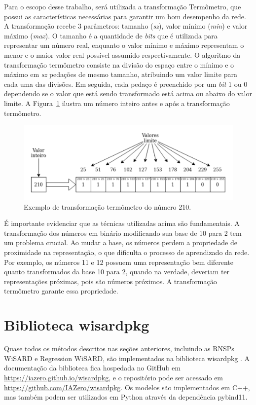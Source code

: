 Para o escopo desse trabalho, será utilizada a transformação Termômetro, que possui as características necessárias para garantir um bom desempenho da rede. A transformação recebe 3 parâmetros: tamanho (\textit{sz}), valor mínimo (\textit{min}) e valor máximo (\textit{max}). O tamanho é a quantidade de \textit{bits} que é utilizada para representar um número real, enquanto o valor mínimo e máximo representam o menor e o maior valor real possível assumido respectivamente. O algoritmo da transformação termômetro consiste na divisão do espaço entre o mínimo e o máximo em \textit{sz} pedações de mesmo tamanho, atribuindo um valor limite para cada uma das divisões. Em seguida, cada pedaço é preenchido por um \textit{bit} $1$ ou $0$ dependendo se o valor que está sendo transformado está acima ou abaixo do valor limite. A Figura~\ref{fig:therm_ex} ilustra um número inteiro antes e após a transformação termômetro.

\begin{figure}[!htp]
    \centering
    \includegraphics[width=5.0in]{img/therm_example.pdf}
    \caption{Exemplo de transformação termômetro do número 210.}
    \label{fig:therm_ex}
\end{figure}

É importante evidenciar que as técnicas utilizadas acima são fundamentais. A transformação dos números em binário modificando sua base de 10 para 2 tem um problema crucial. Ao mudar a base, os números perdem a propriedade de proximidade na representação, o que dificulta o processo de aprendizado da rede. Por exemplo, os números 11 e 12 possuem uma representação bem diferente quanto transformados da base 10 para 2, quando na verdade, deveriam ter representações próximas, pois são números próximos. A transformação termômetro garante essa propriedade.

\section{Biblioteca wisardpkg} \label{sec:wisardpkg}
Quase todos os métodos descritos nas seções anteriores, incluindo as RNSPs WiSARD e Regression WiSARD, são implementados na biblioteca wisardpkg \cite{wisardpkg}. A documentação da biblioteca fica hospedada no GitHub em \url{https://iazero.github.io/wisardpkg}, e o repositório pode ser acessado em \url{https://github.com/IAZero/wisardpkg}. Os modelos são implementados em C++, mas também podem ser utilizados em Python através da dependência pybind11.

